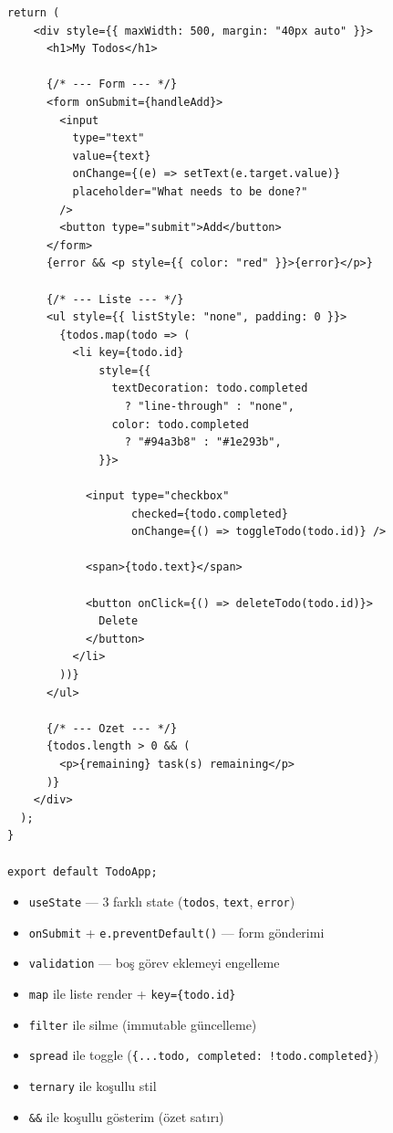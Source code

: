 \documentclass[12pt, a4paper]{article}
\begin{document}
\begin{tcolorbox}[enhanced, colback=codebg, colframe=gray!30,
    colbacktitle=primary!85!black, coltitle=white, arc=4pt,
    title={\sffamily\bfseries\small TodoApp.jsx (devam --- return kısmı)}]
\begin{lstlisting}[style=jsxstyle]
  return (
    <div style={{ maxWidth: 500, margin: "40px auto" }}>
      <h1>My Todos</h1>

      {/* --- Form --- */}
      <form onSubmit={handleAdd}>
        <input
          type="text"
          value={text}
          onChange={(e) => setText(e.target.value)}
          placeholder="What needs to be done?"
        />
        <button type="submit">Add</button>
      </form>
      {error && <p style={{ color: "red" }}>{error}</p>}

      {/* --- Liste --- */}
      <ul style={{ listStyle: "none", padding: 0 }}>
        {todos.map(todo => (
          <li key={todo.id}
              style={{
                textDecoration: todo.completed
                  ? "line-through" : "none",
                color: todo.completed
                  ? "#94a3b8" : "#1e293b",
              }}>

            <input type="checkbox"
                   checked={todo.completed}
                   onChange={() => toggleTodo(todo.id)} />

            <span>{todo.text}</span>

            <button onClick={() => deleteTodo(todo.id)}>
              Delete
            </button>
          </li>
        ))}
      </ul>

      {/* --- Ozet --- */}
      {todos.length > 0 && (
        <p>{remaining} task(s) remaining</p>
      )}
    </div>
  );
}

export default TodoApp;
\end{lstlisting}
\end{tcolorbox}

\vspace{8pt}

\begin{infobox}
\begin{itemize}
  \item \texttt{useState} --- 3 farklı state (\texttt{todos}, \texttt{text}, \texttt{error})
  \item \texttt{onSubmit} + \texttt{e.preventDefault()} --- form gönderimi
  \item \texttt{validation} --- boş görev eklemeyi engelleme
  \item \texttt{map} ile liste render + \texttt{key=\{todo.id\}}
  \item \texttt{filter} ile silme (immutable güncelleme)
  \item \texttt{spread} ile toggle (\texttt{\{...todo, completed: !todo.completed\}})
  \item \texttt{ternary} ile koşullu stil
  \item \texttt{\&\&} ile koşullu gösterim (özet satırı)
\end{itemize}
\end{infobox}
\end{document}
